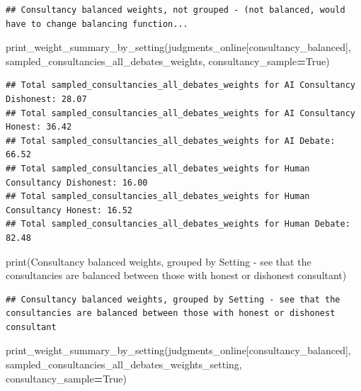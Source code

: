 \documentclass[
]{article}
\newenvironment{Shaded}{\begin{snugshade}}{\end{snugshade}}
\newcommand{\BuiltInTok}[1]{#1}
\newcommand{\NormalTok}[1]{#1}
\newcommand{\OperatorTok}[1]{\textcolor[rgb]{0.81,0.36,0.00}{\textbf{#1}}}
\newcommand{\StringTok}[1]{\textcolor[rgb]{0.31,0.60,0.02}{#1}}
\newcommand{\VariableTok}[1]{\textcolor[rgb]{0.00,0.00,0.00}{#1}}
\begin{document}
\begin{verbatim}
## Consultancy balanced weights, not grouped - (not balanced, would have to change balancing function...
\end{verbatim}

\begin{Shaded}
\begin{Highlighting}[]
\NormalTok{print\_weight\_summary\_by\_setting(judgments\_online[consultancy\_balanced], }\StringTok{\textquotesingle{}sampled\_consultancies\_all\_debates\_weights\textquotesingle{}}\NormalTok{, consultancy\_sample}\OperatorTok{=}\VariableTok{True}\NormalTok{)}
\end{Highlighting}
\end{Shaded}

\begin{verbatim}
## Total sampled_consultancies_all_debates_weights for AI Consultancy Dishonest: 28.07
## Total sampled_consultancies_all_debates_weights for AI Consultancy Honest: 36.42
## Total sampled_consultancies_all_debates_weights for AI Debate: 66.52
## Total sampled_consultancies_all_debates_weights for Human Consultancy Dishonest: 16.00
## Total sampled_consultancies_all_debates_weights for Human Consultancy Honest: 16.52
## Total sampled_consultancies_all_debates_weights for Human Debate: 82.48
\end{verbatim}

\begin{Shaded}
\begin{Highlighting}[]
\BuiltInTok{print}\NormalTok{(}\StringTok{\textquotesingle{}Consultancy balanced weights, grouped by Setting {-} see that the consultancies are balanced between those with honest or dishonest consultant\textquotesingle{}}\NormalTok{)}
\end{Highlighting}
\end{Shaded}

\begin{verbatim}
## Consultancy balanced weights, grouped by Setting - see that the consultancies are balanced between those with honest or dishonest consultant
\end{verbatim}

\begin{Shaded}
\begin{Highlighting}[]
\NormalTok{print\_weight\_summary\_by\_setting(judgments\_online[consultancy\_balanced], }\StringTok{\textquotesingle{}sampled\_consultancies\_all\_debates\_weights\_setting\textquotesingle{}}\NormalTok{, consultancy\_sample}\OperatorTok{=}\VariableTok{True}\NormalTok{)}
\end{Highlighting}
\end{Shaded}
\end{document}
